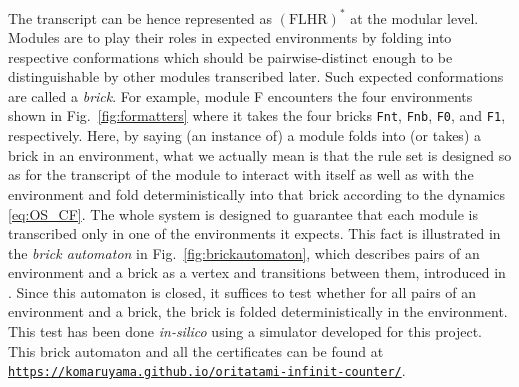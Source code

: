 \documentclass[twocolumn]{svjour3}
\begin{document}
\noindent
The transcript can be hence represented as $(\mathrm{FLHR})^*$ at the modular level. Modules are to play their roles in expected environments by folding into respective conformations which should be pairwise-distinct enough to be distinguishable by other modules transcribed later.
Such expected conformations are called a \textit{brick}.
For example, module F encounters the four environments shown in Fig.~\ref{fig:formatters} where it takes the four bricks \texttt{Fnt}, \texttt{Fnb}, \texttt{F0}, and \texttt{F1}, respectively.
Here, by saying (an instance of) a module folds into (or takes) a brick in an environment, what we actually mean is that the rule set is designed so as for the transcript of the module to interact with itself as well as with the environment and fold deterministically into that brick according to the dynamics  \eqref{eq:OS_CF}.
The whole system is designed to guarantee that each module is transcribed only in one of the environments it expects.
This fact is illustrated in the \textit{brick automaton} in Fig.~\ref{fig:brickautomaton}, which describes pairs of an environment and a brick as a vertex and transitions between them, introduced in \cite{GeMeScSe2019}.
Since this automaton is closed, it suffices to test whether for all pairs of an environment and a brick, the brick is folded deterministically in the environment.
This test has been done \textit{in-silico} using a simulator developed for this project.
This brick automaton and all the certificates can be found at \href{https://komaruyama.github.io/oritatami-infinit-counter/}{\footnotesize \texttt{https://komaruyama.github.io/oritatami-infinit-counter/}}.
\end{document}

